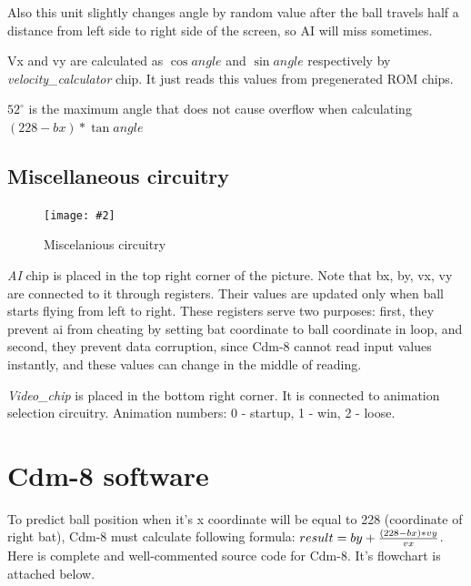 \documentclass[12pt,a4paper]{article}
\let\oldsection\section
\renewcommand\section{\clearpage\oldsection}
\newcommand{\dofigure}[3][H]{
    \begin{figure}[#1]
        \centering
        \texttt{[image: \#2]}
        \caption{#3}
    \end{figure}
}
\newcommand{\chip}[1]{{\itshape#1}}
\begin{document}
    Also this unit slightly changes angle by random value after the ball travels half a distance from left side to right side of the screen, so AI will miss sometimes.

    Vx and vy are calculated as $\cos{angle}$ and $\sin{angle}$ respectively by \chip{velocity\_calculator} chip. It just reads this values from pregenerated ROM chips.

    $52^{\circ}$ is the maximum angle that does not cause overflow when calculating $(228-bx)*\tan{angle}$
    




    
    \subsection{Miscellaneous circuitry}
    \dofigure{misc}{Miscelanious circuitry}
    \chip{AI} chip is placed in the top right corner of the picture. Note that bx, by, vx, vy are connected to it through registers. Their values are updated only when ball starts flying from left  to right. These registers serve two purposes: first, they prevent ai from cheating by setting bat coordinate to ball coordinate in loop, and second, they prevent data corruption, since Cdm-8 cannot read input values instantly, and these values can change in the middle of reading.

    \chip{Video\_chip} is placed in the bottom right corner. It is connected to animation selection circuitry. Animation numbers: 0 - startup, 1 - win, 2 - loose.


    \section{Cdm-8 software}
    To predict ball position when it's x coordinate will be equal to 228 (coordinate of right bat), Cdm-8 must calculate following formula: {\Large $result=by + {(228-bx)*vy \over vx}$}. Here is complete and well-commented source code for Cdm-8. It's flowchart is attached below.
\end{document}
